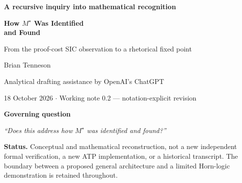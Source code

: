 \documentclass[11pt,letterpaper]{article}
\begin{document}
\thispagestyle{empty}
\vspace*{0.25in}
{\Large\bfseries\color{accent} A recursive inquiry into mathematical recognition}\par
\vspace{0.17in}
{\fontsize{24}{30}\selectfont\bfseries\color{ink} How $M^{\star}$ Was Identified\\[-1pt] and Found}\par
\vspace{0.16in}
{\large From the proof-cost SIC observation to a rhetorical fixed point}\par
\vspace{0.29in}
{\color{muted}Brian Tenneson}\par
{\small\color{muted}Analytical drafting assistance by OpenAI's ChatGPT}\par
{\small\color{muted}18 October 2026 \quad $\cdot$ \quad Working note 0.2 --- notation-explicit revision}\par
\vspace{0.27in}
\noindent\colorbox{pale}{\parbox{\dimexpr\linewidth-2\fboxsep\relax}{\vspace{7pt}\textbf{Governing question}\par\medskip
\centering\emph{``Does this address how $M^{\star}$ was identified and found?''}\par\vspace{7pt}}}
\vspace{0.22in}
\begin{abstract}
\noindent
We recursively elaborate one question until further elaboration contributes no new distinction relevant to the question. The initial insight was the recognition that the proof-cost filtration of theorems, viewed stage by stage, has the shape of a Simulated Intelligent Computer (SIC) history. The recognition did not by itself supply the state and halt maps of a SIC, nor a board-guided automated theorem prover. Those were subsequent construction steps: the original proposal was remarkably close in mathematical shape, while completion of the formal SIC typing and axioms was still required. This revised note defines the notation and explicitly separates a proof-cost horizon from computational time. The resulting rhetorical fixed point distinguishes \emph{seeing}, \emph{specifying}, \emph{controlling}, and \emph{verifying}, while withholding claims of general-purpose implementation or universal speedup. The fixed-point language is explicitly rhetorical: it is stabilization of an explanation under a stated set of questions, not a computability theorem about all possible explanations.
\end{abstract}
\vfill
{\small\color{muted}\textbf{Status.} Conceptual and mathematical reconstruction, not a new independent formal verification, a new ATP implementation, or a historical transcript. The boundary between a proposed general architecture and a limited Horn-logic demonstration is retained throughout.}\par
\newpage
\end{document}
